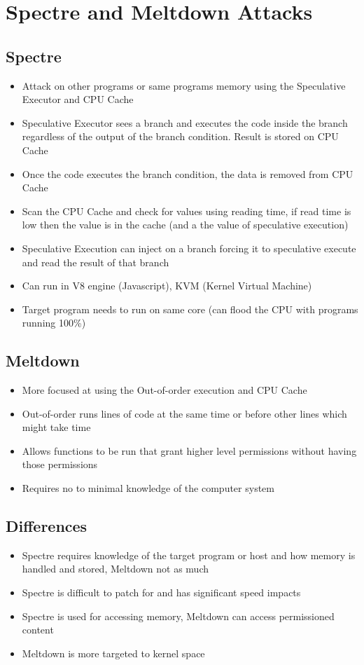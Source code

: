 \section{Spectre and Meltdown Attacks}
\subsection{Spectre}
\begin{itemize}
	\item Attack on other programs or same programs memory using the Speculative Executor and CPU Cache
	\item Speculative Executor sees a branch and executes the code inside the branch regardless of the output of the branch condition. Result is stored on CPU Cache
	\item Once the code executes the branch condition, the data is removed from CPU Cache
	\item Scan the CPU Cache and check for values using reading time, if read time is low then the value is in the cache (and a the value of speculative execution)
	\item Speculative Execution can inject on a branch forcing it to speculative execute and read the result of that branch
	\item Can run in V8 engine (Javascript), KVM (Kernel Virtual Machine)
	\item Target program needs to run on same core (can flood the CPU with programs running 100\%)
\end{itemize}
\subsection{Meltdown}
\begin{itemize}
	\item More focused at using the Out-of-order execution and CPU Cache
	\item Out-of-order runs lines of code at the same time or before other lines which might take time
	\item Allows functions to be run that grant higher level permissions without having those permissions
	\item Requires no to minimal knowledge of the computer system
\end{itemize}
\subsection{Differences}
\begin{itemize}
	\item Spectre requires knowledge of the target program or host and how memory is handled and stored, Meltdown not as much
	\item Spectre is difficult to patch for and has significant speed impacts
	\item Spectre is used for accessing memory, Meltdown can access permissioned content
	\item Meltdown is more targeted to kernel space
\end{itemize}